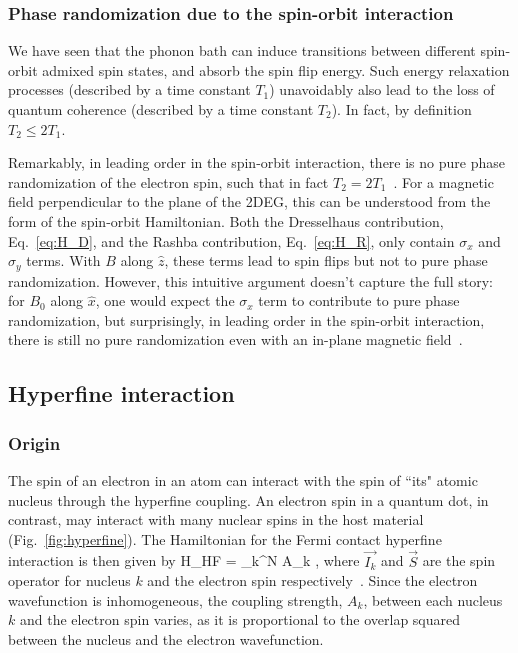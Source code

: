 \documentclass[12pt,aps,nofootinbib]{revtex4-1}
\begin{document}

\subsubsection{Phase randomization due to the spin-orbit interaction}

We have seen that the phonon bath can induce transitions between
different spin-orbit admixed spin states, and absorb the spin flip
energy. Such energy relaxation processes (described by a time constant $T_1$) unavoidably also lead to the loss of quantum coherence
(described by a time constant $T_2$). In fact, by definition $T_2
\le 2 T_1$.

Remarkably, in leading order in the spin-orbit interaction, there
is no pure phase randomization of the electron spin, such that in
fact $T_2 = 2 T_1$~\cite{golovach04}. For a magnetic field
perpendicular to the plane of the 2DEG, this can be understood
from the form of the spin-orbit Hamiltonian. Both the Dresselhaus
contribution, Eq.~\ref{eq:H_D}, and the Rashba contribution,
Eq.~\ref{eq:H_R}, only contain $\sigma_x$ and $\sigma_y$ terms.
With $B$ along $\hat{z}$, these terms lead to spin flips but not
to pure phase randomization. However, this intuitive argument doesn't capture the full story:
for $B_0$ along $\hat{x}$, one
would expect the $\sigma_x$ term to contribute to pure phase
randomization, but surprisingly, in leading order in the spin-orbit
interaction, there is still no pure randomization even with an
in-plane magnetic field~\cite{golovach04}.



\subsection{Hyperfine interaction}
\label{Section:Hyperfine}
\subsubsection{Origin}

The spin of an electron in an atom can interact with the spin of
``its" atomic nucleus through the hyperfine coupling. An electron
spin in a quantum dot, in contrast, may interact with many nuclear
spins in the host material (Fig.~\ref{fig:hyperfine}). The Hamiltonian for the Fermi contact hyperfine interaction is then given by 
\be 
{\cal H}_{HF} = \sum_k^N A_k   \;, 
\label{eq:H_HF} 
\ee
where $\vec{I_k}$ and $\vec{S}$ are the spin operator for nucleus
$k$ and the electron spin respectively~\cite{Abragam,Slichter,Abragam-Bleaney,BookOptical}. Since the electron wavefunction is inhomogeneous, the coupling strength, $A_k$, between each nucleus $k$ and the electron spin varies, as it is proportional to the overlap squared between the nucleus and the electron wavefunction.  
\end{document}

